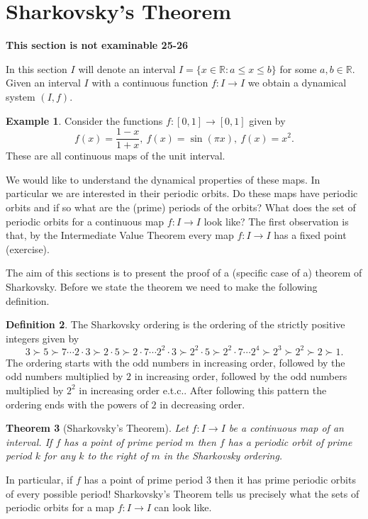 \documentclass[12pt]{article}
\newtheorem{theorem}{Theorem}[section]
\theoremstyle{definition}
\newtheorem{definition}[theorem]{Definition}
\newtheorem{example}[theorem]{Example}
\theoremstyle{remark}
\begin{document}
\section{Sharkovsky's Theorem}
\textbf{This section is not examinable 25-26}

In this section $I$ will denote an interval $I = \{ x \in \mathbb{R} : a \le x \le  b\}$ for some $a,b\in \mathbb{R}$.
Given an interval $I$ with a continuous function $f: I \to I$ we obtain a dynamical system $(I,f)$. 
\begin{example}
Consider the functions $f: [0,1] \to [0,1]$ given by 
\[
f(x) = \frac{1-x}{1+x}, \ f(x) = \sin(\pi x), \ f(x) = x^2.
\]
These are all continuous maps of the unit interval.
\end{example}
We would like to understand the dynamical properties of these maps. In particular we are interested in their periodic orbits. Do these maps have periodic orbits and if so what are the (prime) periods of the orbits? What does the set of periodic orbits for a continuous map $f: I \to I$ look like? The first observation is that, by the Intermediate Value Theorem every map $f: I \to I$ has a fixed point (exercise).

The aim of this sections is to present the proof of a (specific case of a) theorem of Sharkovsky.
Before we state the theorem we need to make the following definition.

\begin{definition}
The Sharkovsky ordering is the ordering of the strictly positive integers given by
\[
3 \succ 5 \succ 7 \cdots 2 \cdot 3 \succ 2 \cdot 5 \succ  2 \cdot 7 \cdots 2^2 \cdot 3 \succ  2^2 \cdot5 \succ 2^2  \cdot 7 \cdots 2^4 \succ 2^3 \succ 2^2 \succ 2 \succ 1.
\]
The ordering starts with the odd numbers in increasing order, followed by the odd numbers multiplied by $2$ in increasing order, followed by the odd numbers multiplied by $2^2$ in increasing order e.t.c.. After following this pattern the ordering ends with the powers of $2$ in decreasing order.
\end{definition}

\begin{theorem}[Sharkovsky's Theorem]
Let $f: I \to I$ be a continuous map of an interval. If $f$ has a point of prime period $m$ then $f$ has a periodic orbit of prime period $k$ for any $k$ to the right of $m$ in the Sharkovsky ordering.
\end{theorem}

In particular, if $f$ has a point of prime period $3$ then it has prime periodic orbits of every possible period!
Sharkovsky's Theorem tells us precisely what the sets of periodic orbits for a map $f : I \to I$ can look like.
\end{document}
